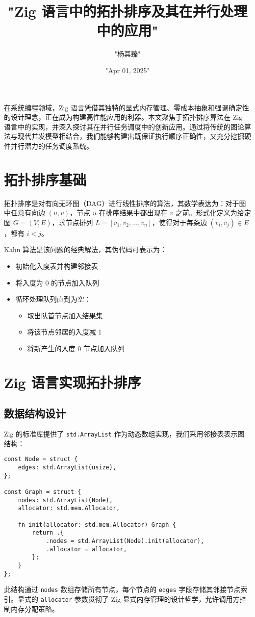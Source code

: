 \title{"Zig 语言中的拓扑排序及其在并行处理中的应用"}
\author{"杨其臻"}
\date{"Apr 01, 2025"}
\maketitle
在系统编程领域，Zig 语言凭借其独特的显式内存管理、零成本抽象和强调确定性的设计理念，正在成为构建高性能应用的利器。本文聚焦于拓扑排序算法在 Zig 语言中的实现，并深入探讨其在并行任务调度中的创新应用。通过将传统的图论算法与现代并发模型相结合，我们能够构建出既保证执行顺序正确性，又充分挖掘硬件并行潜力的任务调度系统。\par
\chapter{拓扑排序基础}
拓扑排序是对有向无环图（DAG）进行线性排序的算法，其数学表达为：对于图中任意有向边 $(u, v)$，节点 $u$ 在排序结果中都出现在 $v$ 之前。形式化定义为给定图 $G=(V, E)$，求节点排列 $L = [v_1, v_2, ..., v_n]$，使得对于每条边 $(v_i, v_j) \in E$，都有 $i < j$。\par
Kahn 算法是该问题的经典解法，其伪代码可表示为：\par
\begin{itemize}
\item 初始化入度表并构建邻接表
\item 将入度为 0 的节点加入队列
\item 循环处理队列直到为空：\begin{itemize}
\item 取出队首节点加入结果集
\item 将该节点邻居的入度减 1
\item 将新产生的入度 0 节点加入队列
\end{itemize}

\end{itemize}
\chapter{Zig 语言实现拓扑排序}
\section{数据结构设计}
Zig 的标准库提供了 \verb!std.ArrayList! 作为动态数组实现，我们采用邻接表表示图结构：\par
\begin{lstlisting}[language=zig]
const Node = struct {
    edges: std.ArrayList(usize),
};

const Graph = struct {
    nodes: std.ArrayList(Node),
    allocator: std.mem.Allocator,

    fn init(allocator: std.mem.Allocator) Graph {
        return .{
            .nodes = std.ArrayList(Node).init(allocator),
            .allocator = allocator,
        };
    }
};
\end{lstlisting}
此结构通过 \verb!nodes! 数组存储所有节点，每个节点的 \verb!edges! 字段存储其邻接节点索引。显式的 \verb!allocator! 参数贯彻了 Zig 显式内存管理的设计哲学，允许调用方控制内存分配策略。\par
